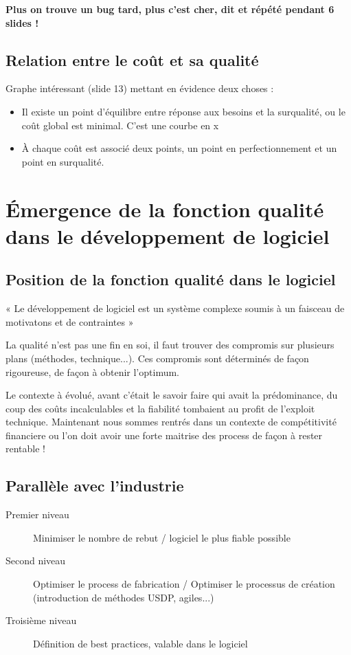 \textbf{Plus on trouve un bug tard, plus c'est cher, dit et répété pendant 6 slides !}

	\subsection{Relation entre le coût et sa qualité}

	Graphe intéressant (slide 13) mettant en évidence deux choses :

	\begin{itemize}
    \item Il existe un point d'équilibre entre réponse aux besoins et la surqualité, ou le coût global est minimal. C’est une courbe en x
    \item À chaque coût est associé deux points, un point en perfectionnement et un point en surqualité.
	\end{itemize}



\section{Émergence de la fonction qualité dans le développement de logiciel}

	\subsection{Position de la fonction qualité dans le logiciel}

    « Le développement de logiciel est un système complexe soumis à un faisceau de motivatons et de contraintes »

La qualité n’est pas une fin en soi, il faut trouver des compromis sur plusieurs plans (méthodes, technique...). Ces compromis sont déterminés de façon rigoureuse, de façon à obtenir l’optimum.

Le contexte à évolué, avant c’était le savoir faire qui avait la prédominance, du coup des coûts incalculables et la fiabilité tombaient au profit de l’exploit technique. Maintenant nous sommes rentrés dans un contexte de compétitivité financiere ou l'on doit avoir une forte maitrise des process de façon à rester rentable !

	\subsection{Parallèle avec l’industrie}
	
	\begin{description}
	\item[Premier niveau] Minimiser le nombre de rebut  / logiciel le plus fiable possible
	\item[Second niveau] Optimiser le process de fabrication  / Optimiser le processus de création (introduction de méthodes USDP, agiles...)
	\item[Troisième niveau]Définition de best practices, valable dans le logiciel
	\end{description}


